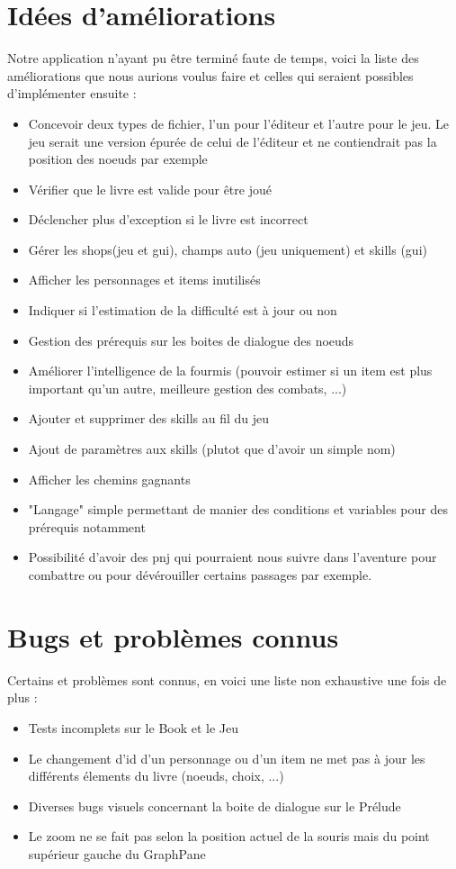 	\section{Idées d'améliorations}

		Notre application n'ayant pu être terminé faute de temps, voici la liste des améliorations que nous aurions voulus faire et celles qui seraient possibles d'implémenter ensuite :

		\begin{itemize}
			\item{Concevoir deux types de fichier, l'un pour l'éditeur et l'autre pour le jeu. Le jeu serait une version épurée de celui de l'éditeur et ne contiendrait pas la position des noeuds par exemple}
			\item{Vérifier que le livre est valide pour être joué}
			\item{Déclencher plus d'exception si le livre est incorrect}
			\item{Gérer les shops(jeu et gui), champs auto (jeu uniquement) et skills (gui)}
			\item{Afficher les personnages et items inutilisés}
			\item{Indiquer si l'estimation de la difficulté est à jour ou non}
			\item{Gestion des prérequis sur les boites de dialogue des noeuds}
			\item{Améliorer l'intelligence de la fourmis (pouvoir estimer si un item est plus important qu'un autre, meilleure gestion des combats, ...)}
			\item{Ajouter et supprimer des skills au fil du jeu}
			\item{Ajout de paramètres aux skills (plutot que d'avoir un simple nom)}
			\item{Afficher les chemins gagnants}
			\item{"Langage" simple permettant de manier des conditions et variables pour des prérequis notamment}
			\item{Possibilité d'avoir des pnj qui pourraient nous suivre dans l'aventure pour combattre ou pour dévérouiller certains passages par exemple.}
		\end{itemize}

	\section{Bugs et problèmes connus}

		Certains et problèmes sont connus, en voici une liste non exhaustive une fois de plus :

		\begin{itemize}
			\item{Tests incomplets sur le Book et le Jeu}
			\item{Le changement d'id d'un personnage ou d'un item ne met pas à jour les différents élements du livre (noeuds, choix, ...)}
			\item{Diverses bugs visuels concernant la boite de dialogue sur le Prélude}
			\item{Le zoom ne se fait pas selon la position actuel de la souris mais du point supérieur gauche du GraphPane}
		\end{itemize}
